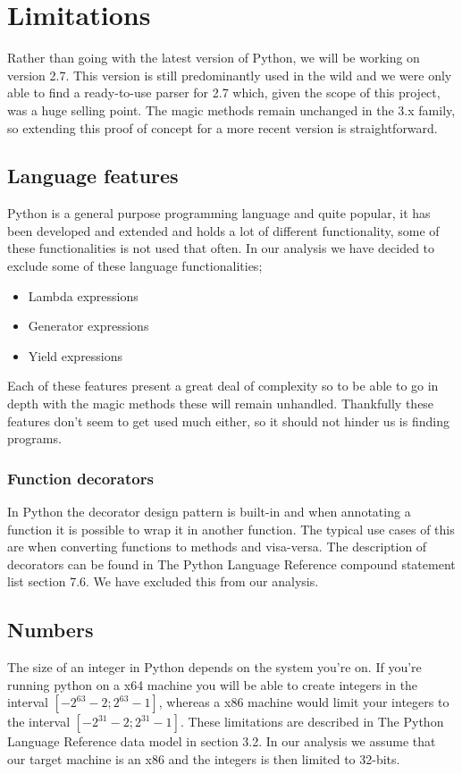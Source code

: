 \chapter{Limitations}

Rather than going with the latest version of Python, we will be working on version 2.7. This version is still predominantly used in the wild and we were only able to find a ready-to-use parser for 2.7 which, given the scope of this project, was a huge selling point. The magic methods remain unchanged in the 3.x family, so extending this proof of concept for a more recent version is straightforward.

\section{Language features}
Python is a general purpose programming language and quite popular, it has been developed and extended and holds a lot of different functionality, some of these functionalities is not used that often. In our analysis we have decided to exclude some of these language functionalities;

\begin{itemize}
	\item Lambda expressions
	\item Generator expressions
	\item Yield expressions
\end{itemize}

Each of these features present a great deal of complexity so to be able to go in depth with the magic methods these will remain unhandled. Thankfully these features don't seem to get used much either, so it should not hinder us is finding programs.

\subsection{Function decorators}
In Python the decorator design pattern is built-in and when annotating a function it is possible to wrap it in another function. The typical use cases of this are when converting functions to methods and visa-versa. The description of decorators can be found in The Python Language Reference compound statement list\cite{pyref.compound} section 7.6. We have excluded this from our analysis.

\section{Numbers}
The size of an integer in Python depends on the system you're on. If you're running python on a x64 machine you will be able to create integers in the interval $[-2^{63}-2;2^{63}-1]$, whereas a x86 machine would limit your integers to the interval $[-2^{31}-2;2^{31}-1]$. These limitations are described in The Python Language Reference data model\cite{pyref.datamodel} in section 3.2. In our analysis we assume that our target machine is an x86 and the integers is then limited to 32-bits.


